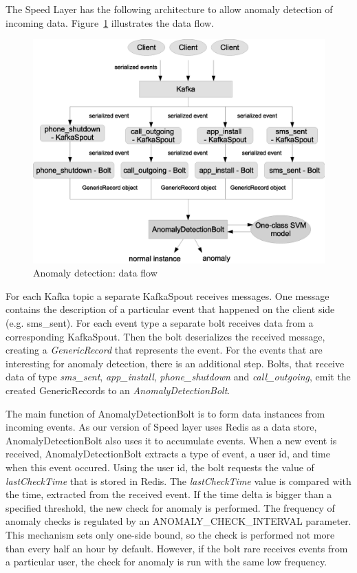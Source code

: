 The Speed Layer has the following architecture to allow anomaly detection of incoming data.
Figure~\ref{fig:anomaly_detection_data_flow} illustrates the data flow.

\begin{figure}[h]
  \centering
  \includegraphics [width=1.0\textwidth]{images/anomaly_detection_data_flow}
  \caption{Anomaly detection: data flow}
  \label{fig:anomaly_detection_data_flow}
\end{figure}

For each Kafka topic a separate KafkaSpout receives messages.
One message contains the description of a particular event that happened on the client side (e.g. sms\_sent).
For each event type a separate bolt receives data from a corresponding KafkaSpout.
Then the bolt deserializes the received message, creating a \textit{GenericRecord} that represents the event.
For the events that are interesting for anomaly detection, there is an additional step.
Bolts, that receive data of type \textit{sms\_sent}, \textit{app\_install}, \textit{phone\_shutdown} and \textit{call\_outgoing}, emit the created GenericRecords to an \textit{AnomalyDetectionBolt}.

The main function of AnomalyDetectionBolt is to form data instances from incoming events.
As our version of Speed layer uses Redis as a data store, AnomalyDetectionBolt also uses it to accumulate events.
When a new event is received, AnomalyDetectionBolt extracts a type of event, a user id, and time when this event occured.
Using the user id, the bolt requests the value of \textit{lastCheckTime} that is stored in Redis.
The \textit{lastCheckTime} value is compared with the time, extracted from the received event.
If the time delta is bigger than a specified threshold, the new check for anomaly is performed.
The frequency of anomaly checks is regulated by an ANOMALY\_CHECK\_INTERVAL parameter.
This mechanism sets only one-side bound, so the check is performed not more than every half an hour by default.
However, if the bolt rare receives events from a particular user, the check for anomaly is run with the same low frequency. 

